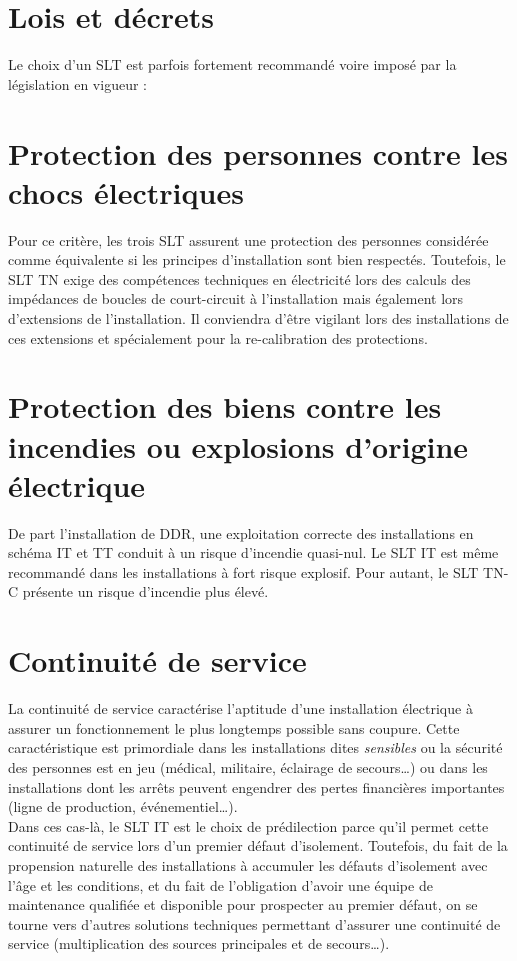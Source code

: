 \section{Lois et décrets}

Le choix d'un SLT est parfois fortement recommandé voire imposé par la législation en vigueur :



\section{Protection des personnes contre les chocs électriques}

Pour ce critère, les trois SLT assurent une protection des personnes considérée comme équivalente si les principes d'installation sont bien respectés. Toutefois, le SLT TN exige des compétences techniques en électricité lors des calculs des impédances de boucles de court-circuit à l'installation mais également lors d'extensions de l'installation. Il conviendra d'être vigilant lors des installations de ces extensions et spécialement pour la re-calibration des protections.

\section{Protection des biens contre les incendies ou explosions d'origine électrique}

De part l'installation de DDR, une exploitation correcte des installations en schéma IT et TT conduit à un risque d'incendie quasi-nul. Le SLT IT est même recommandé dans les installations à fort risque explosif. Pour autant, le SLT TN-C présente un risque d'incendie plus élevé. 

\section{Continuité de service}

La continuité de service caractérise l'aptitude d'une installation électrique à assurer un fonctionnement le plus longtemps possible sans coupure. Cette caractéristique est primordiale dans les installations dites \emph{sensibles} ou la sécurité des personnes est en jeu (médical, militaire, éclairage de secours\ldots) ou dans les installations dont les arrêts peuvent engendrer des pertes financières importantes (ligne de production, événementiel\ldots).\\
Dans ces cas-là, le SLT IT est le choix de prédilection parce qu'il permet cette continuité de service lors d'un premier défaut d'isolement. Toutefois, du fait de la propension naturelle des installations à accumuler les défauts d'isolement avec l'âge et les conditions, et du fait de l'obligation d'avoir une équipe de maintenance qualifiée et disponible pour prospecter au premier défaut, on se tourne vers d'autres solutions techniques permettant d'assurer une continuité de service (multiplication des sources principales et de secours\ldots). 

